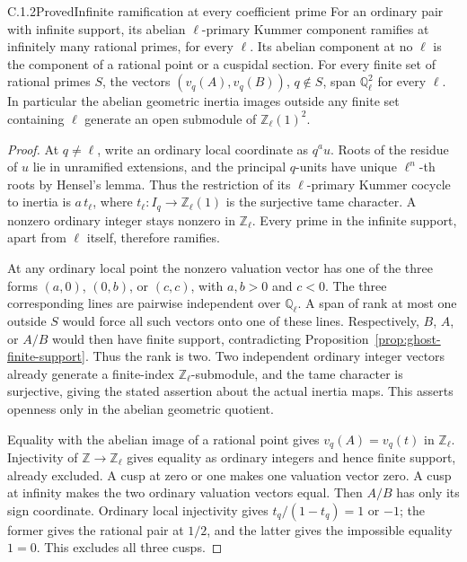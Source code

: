\begin{result}{C.1.2}{Proved}{Infinite ramification at every coefficient prime}
\label{prop:ghost-infinite-ramification}
For an ordinary pair with infinite support, its abelian
\(\ell\)-primary Kummer component ramifies at infinitely many
rational primes, for every \(\ell\). Its abelian component at
no \(\ell\) is the component of a rational point or a cuspidal
section.
For every finite set of rational primes \(S\), the vectors
\((v_q(A),v_q(B))\), \(q\notin S\), span
\(\mathbb Q_\ell^2\) for every \(\ell\). In particular the
abelian geometric inertia images outside any finite set
containing \(\ell\) generate an open submodule of
\(\mathbb Z_\ell(1)^2\).
\end{result}
\begin{proof}
At \(q\ne\ell\), write an ordinary local coordinate as
\(q^a u\). Roots of the residue of \(u\) lie in unramified
extensions, and the principal \(q\)-units have unique
\(\ell^n\)-th roots by Hensel's lemma. Thus the restriction of
its \(\ell\)-primary Kummer cocycle to inertia is
\(a\,t_\ell\), where \(t_\ell:I_q\to\mathbb Z_\ell(1)\)
is the surjective tame character. A nonzero ordinary integer stays
nonzero in \(\mathbb Z_\ell\). Every prime in the infinite
support, apart from \(\ell\) itself, therefore ramifies.

At any ordinary local point the nonzero valuation vector has
one of the three forms \((a,0)\), \((0,b)\), or \((c,c)\),
with \(a,b>0\) and \(c<0\). The three corresponding lines
are pairwise independent over \(\mathbb Q_\ell\). A span of
rank at most one outside \(S\) would force all such vectors
onto one of these lines. Respectively, \(B\), \(A\), or
\(A/B\) would then have finite support, contradicting
Proposition~\ref{prop:ghost-finite-support}. Thus the rank is
two. Two independent ordinary integer vectors already generate
a finite-index \(\mathbb Z_\ell\)-submodule, and the tame
character is surjective, giving the stated assertion about the
actual inertia maps. This asserts openness only in the abelian
geometric quotient.

Equality with the abelian image of a rational point gives
\(v_q(A)=v_q(t)\) in \(\mathbb Z_\ell\). Injectivity of
\(\mathbb Z\to\mathbb Z_\ell\) gives equality as ordinary
integers and hence finite support, already excluded. A cusp at
zero or one makes one valuation vector zero. A cusp at infinity
makes the two ordinary valuation vectors equal. Then \(A/B\)
has only its sign coordinate. Ordinary local injectivity gives
\(t_q/(1-t_q)=1\) or \(-1\); the former gives the rational pair
at \(1/2\), and the latter gives the impossible equality
\(1=0\). This excludes all three cusps.
\end{proof}

